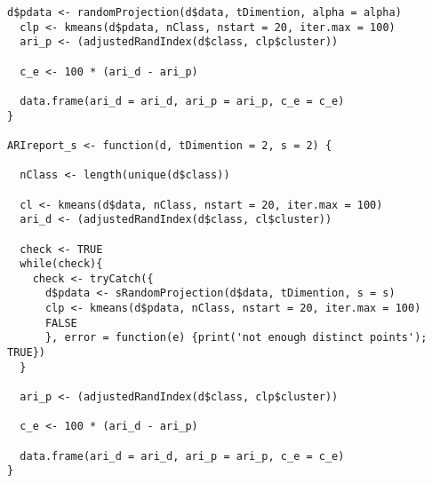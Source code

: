 \begin{latin}
\begin{Verbatim}[breaklines=true, breakanywhere=true, baselinestretch=1]
  d$pdata <- randomProjection(d$data, tDimention, alpha = alpha)
  clp <- kmeans(d$pdata, nClass, nstart = 20, iter.max = 100)
  ari_p <- (adjustedRandIndex(d$class, clp$cluster))
  
  c_e <- 100 * (ari_d - ari_p)
  
  data.frame(ari_d = ari_d, ari_p = ari_p, c_e = c_e)
}

ARIreport_s <- function(d, tDimention = 2, s = 2) {
  
  nClass <- length(unique(d$class))
  
  cl <- kmeans(d$data, nClass, nstart = 20, iter.max = 100)
  ari_d <- (adjustedRandIndex(d$class, cl$cluster))
  
  check <- TRUE
  while(check){
    check <- tryCatch({
      d$pdata <- sRandomProjection(d$data, tDimention, s = s)
      clp <- kmeans(d$pdata, nClass, nstart = 20, iter.max = 100)
      FALSE
      }, error = function(e) {print('not enough distinct points'); TRUE})
  }
  
  ari_p <- (adjustedRandIndex(d$class, clp$cluster))
  
  c_e <- 100 * (ari_d - ari_p)
  
  data.frame(ari_d = ari_d, ari_p = ari_p, c_e = c_e)
}

\end{Verbatim}
\end{latin}


